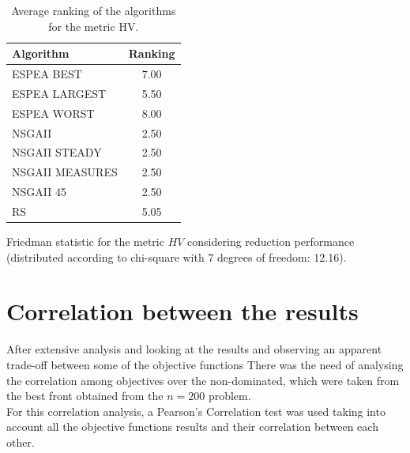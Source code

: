 \begin{table}[H]
    \centering
    \begin{threeparttable}
    \begin{tabular}{lc}
    \hline
    Algorithm&Ranking\\
    \hline
    ESPEA BEST&7.00\\
    ESPEA LARGEST&5.50\\
    ESPEA WORST&8.00\\
    NSGAII&2.50\\
    NSGAII STEADY&2.50\\
    NSGAII MEASURES&2.50\\
    NSGAII 45&2.50\\
    RS&5.05\\
    \hline
    \end{tabular}
    \begin{tablenotes}
        \small
        \item Friedman statistic for the metric $HV$ considering reduction performance (distributed according to chi-square with 7 degrees of freedom: 12.16).
        \end{tablenotes}
    \end{threeparttable}
    \caption{Average ranking of the algorithms for the metric HV.}
    \label{tab:fried_smp_hv}
\end{table}
    

\section{Correlation between the results}

After extensive analysis and looking at the results and observing an apparent trade-off between some of the objective functions There was the need of analysing the correlation among objectives over the non-dominated, which were taken from the best front obtained from the $n=200$ problem.\\

For this correlation analysis, a Pearson's Correlation test was used taking into account all the objective functions results and their correlation between each other.

